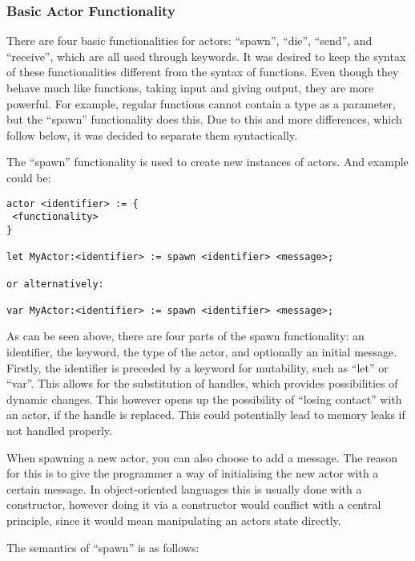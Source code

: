 \subsubsection{Basic Actor Functionality}

There are four basic functionalities for actors: \enquote{spawn}, \enquote{die}, \enquote{send}, and \enquote{receive}, which are all used through keywords. It was desired to keep the syntax of these functionalities different from the syntax of functions. Even though they behave much like functions, taking input and giving output, they are more powerful. For example, regular functions cannot contain a type as a parameter, but the \enquote{spawn} functionality does this. Due to this and more differences, which follow below, it was decided to separate them syntactically.

The \enquote{spawn} functionality is used to create new instances of actors. And example could be:

\label{actorfuncSpawn}
\begin{lstlisting}
actor <identifier> := {
 <functionality>
}

let MyActor:<identifier> := spawn <identifier> <message>;

or alternatively:

var MyActor:<identifier> := spawn <identifier> <message>;
\end{lstlisting}

As can be seen above, there are four parts of the spawn functionality: an identifier, the keyword, the type of the actor, and optionally an initial message. Firstly, the identifier is preceded by a keyword for mutability, such as \enquote{let} or \enquote{var}. This allows for the substitution of handles, which provides possibilities of dynamic changes. This however opens up the possibility of \enquote{losing contact} with an actor, if the handle is replaced. This could potentially lead to memory leaks if not handled properly. 

When spawning a new actor, you can also choose to add a message. The reason for this is to give the programmer a way of initialising the new actor with a certain message. In object-oriented languages this is usually done with a constructor, however doing it via a constructor would conflict with a central principle, since it would mean manipulating an actors state directly.

The semantics of \enquote{spawn} is as follows:

